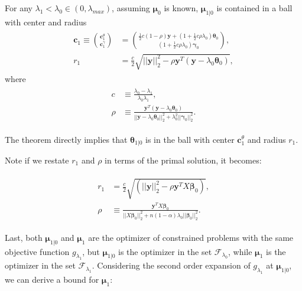 \begin{theorem}
    \label{thm:1.1.alt}
    For any $\lambda_1<\lambda_{0}\in (0,\lambda_{max})$, assuming $\boldsymbol\mu_0$ is known, $\boldsymbol\mu_{1|0}$ is contained in a ball with center and radius
    \begin{gather}
        \begin{aligned}
            \boldsymbol c_1\equiv\binom{\boldsymbol c_1^\theta}{\boldsymbol c_1^\gamma}&=\binom{\frac{1}{2}c(1-\rho)\boldsymbol y+(1+\frac{1}{2}c\rho\lambda_0)\boldsymbol\theta_{0}}{(1+\frac{1}{2}c\rho\lambda_0)\boldsymbol\gamma_{0}},\\
            r_1&=\frac{c}{2}\sqrt{||\boldsymbol y||_2^2-\rho \boldsymbol y^T(\boldsymbol y-\lambda_0\boldsymbol\theta_{0})},
        \end{aligned}
    \end{gather}
    where
    \begin{gather}
        \begin{aligned}
            c&\equiv\frac{\lambda_0-\lambda_1}{\lambda_0\lambda_1},\\
            \rho&\equiv\frac{\boldsymbol y^T(\boldsymbol y-\lambda_0\boldsymbol\theta_{0})}{||\boldsymbol y-\lambda_0\boldsymbol\theta_{0}||_2^2+\lambda_0^2||\boldsymbol\gamma_{0}||_2^2}.\nonumber
        \end{aligned}
    \end{gather}
\end{theorem}
The theorem  directly implies that $\boldsymbol\theta_{1|0}$ is in the ball with center $\boldsymbol c_1^\theta$ and radius $r_1$.

Note if we restate $r_1$ and $\rho$ in terms of the primal solution, it becomes:

\begin{gather}
    \label{eq:thm1prim}
    \begin{aligned}
        r_1&=\frac{c}{2}\sqrt{(||\boldsymbol y||_2^2-\rho \boldsymbol y^TX\boldsymbol\beta_{0})},\\
        \rho&\equiv\frac{\boldsymbol y^TX\boldsymbol\beta_{0}}{||X\boldsymbol\beta_{0}||_2^2+n(1-\alpha)\lambda_0||\boldsymbol\beta_{0}||_2^2}.
    \end{aligned}
\end{gather}

Last, both $\boldsymbol\mu_{1|0}$ and $\boldsymbol\mu_1$ are the optimizer of constrained problems with the same objective function $g_{\lambda_1}$, but $\boldsymbol\mu_{1|0}$ is the optimizer in the set $\mathcal{F}_{\lambda_0}$, while $\boldsymbol\mu_1$ is the optimizer in the set $\mathcal{F}_{\lambda_1}$. Considering the second order expansion of $g_{\lambda_1}$ at $\boldsymbol\mu_{1|0}$, we can derive a bound for $\boldsymbol\mu_1$:

